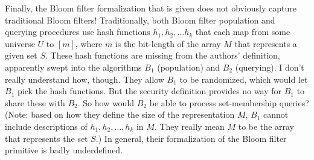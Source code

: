 
Finally, the Bloom filter formalization that is given does not obviously capture traditional Bloom filters!  Traditionally, both Bloom filter population and querying procedures use hash functions $h_1,h_2,...h_k$ that each map from some universe $U$ to $[m]$, where $m$ is the bit-length of the array $M$ that represents a given set $S$.  These hash functions are missing from the authors’ definition, apparently swept into the algorithms $B_1$ (population) and $B_2$ (querying).  I don't really understand how, though. They allow $B_1$ to be randomized, which would let $B_1$ pick the hash functions.  But the security definition provides no way for $B_1$ to share these with $B_2$.  So how would $B_2$ be able to process set-membership queries?  (Note: based on how they define the size of the representation $M$, $B_1$ cannot include descriptions of $h_1, h_2, \ldots , h_k$ in $M$.  They really mean $M$ to be the array that represents the set $S$.)  In general, their formalization of the Bloom filter primitive is badly underdefined.


